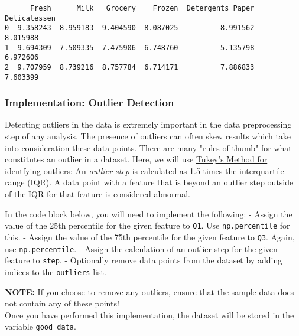 \documentclass[11pt]{article}
\begin{document}
    
    \begin{verbatim}
      Fresh      Milk   Grocery    Frozen  Detergents_Paper  Delicatessen
0  9.358243  8.959183  9.404590  8.087025          8.991562      8.015988
1  9.694309  7.509335  7.475906  6.748760          5.135798      6.972606
2  9.707959  8.739216  8.757784  6.714171          7.886833      7.603399
    \end{verbatim}

    
    \subsubsection{Implementation: Outlier
Detection}\label{implementation-outlier-detection}

Detecting outliers in the data is extremely important in the data
preprocessing step of any analysis. The presence of outliers can often
skew results which take into consideration these data points. There are
many "rules of thumb" for what constitutes an outlier in a dataset.
Here, we will use
\href{http://datapigtechnologies.com/blog/index.php/highlighting-outliers-in-your-data-with-the-tukey-method/}{Tukey's
Method for identfying outliers}: An \emph{outlier step} is calculated as
1.5 times the interquartile range (IQR). A data point with a feature
that is beyond an outlier step outside of the IQR for that feature is
considered abnormal.

In the code block below, you will need to implement the following: -
Assign the value of the 25th percentile for the given feature to
\texttt{Q1}. Use \texttt{np.percentile} for this. - Assign the value of
the 75th percentile for the given feature to \texttt{Q3}. Again, use
\texttt{np.percentile}. - Assign the calculation of an outlier step for
the given feature to \texttt{step}. - Optionally remove data points from
the dataset by adding indices to the \texttt{outliers} list.

\textbf{NOTE:} If you choose to remove any outliers, ensure that the
sample data does not contain any of these points!\\
Once you have performed this implementation, the dataset will be stored
in the variable \texttt{good\_data}.
\end{document}
